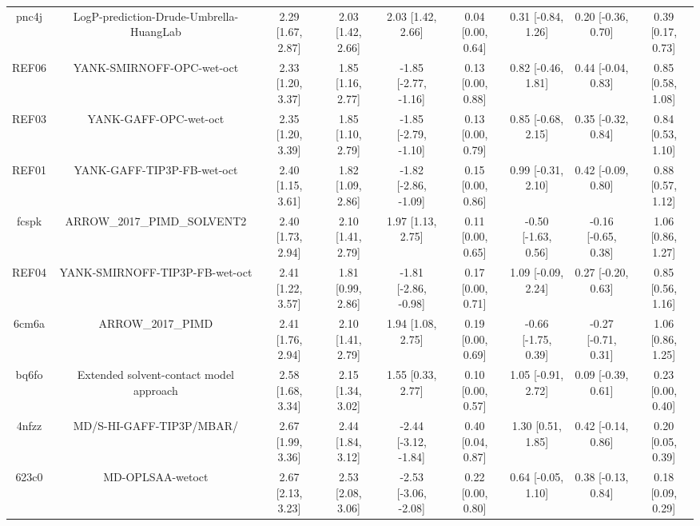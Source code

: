 \documentclass{article}
\begin{document}
\begin{center}
\begin{longtable}{|ccccccccc|}
 pnc4j &            LogP-prediction-Drude-Umbrella-HuangLab &  2.29 [1.67, 2.87] &  2.03 [1.42, 2.66] &     2.03 [1.42, 2.66] &  0.04 [0.00, 0.64] &   0.31 [-0.84, 1.26] &   0.20 [-0.36, 0.70] &     0.39 [0.17, 0.73] \\
 REF06 &                          YANK-SMIRNOFF-OPC-wet-oct &  2.33 [1.20, 3.37] &  1.85 [1.16, 2.77] &  -1.85 [-2.77, -1.16] &  0.13 [0.00, 0.88] &   0.82 [-0.46, 1.81] &   0.44 [-0.04, 0.83] &     0.85 [0.58, 1.08] \\
 REF03 &                              YANK-GAFF-OPC-wet-oct &  2.35 [1.20, 3.39] &  1.85 [1.10, 2.79] &  -1.85 [-2.79, -1.10] &  0.13 [0.00, 0.79] &   0.85 [-0.68, 2.15] &   0.35 [-0.32, 0.84] &     0.84 [0.53, 1.10] \\
 REF01 &                         YANK-GAFF-TIP3P-FB-wet-oct &  2.40 [1.15, 3.61] &  1.82 [1.09, 2.86] &  -1.82 [-2.86, -1.09] &  0.15 [0.00, 0.86] &   0.99 [-0.31, 2.10] &   0.42 [-0.09, 0.80] &     0.88 [0.57, 1.12] \\
 fcspk &                        ARROW\_2017\_PIMD\_SOLVENT2 &  2.40 [1.73, 2.94] &  2.10 [1.41, 2.79] &     1.97 [1.13, 2.75] &  0.11 [0.00, 0.65] &  -0.50 [-1.63, 0.56] &  -0.16 [-0.65, 0.38] &     1.06 [0.86, 1.27] \\
 REF04 &                     YANK-SMIRNOFF-TIP3P-FB-wet-oct &  2.41 [1.22, 3.57] &  1.81 [0.99, 2.86] &  -1.81 [-2.86, -0.98] &  0.17 [0.00, 0.71] &   1.09 [-0.09, 2.24] &   0.27 [-0.20, 0.63] &     0.85 [0.56, 1.16] \\
 6cm6a &                                  ARROW\_2017\_PIMD &  2.41 [1.76, 2.94] &  2.10 [1.41, 2.79] &     1.94 [1.08, 2.75] &  0.19 [0.00, 0.69] &  -0.66 [-1.75, 0.39] &  -0.27 [-0.71, 0.31] &     1.06 [0.86, 1.25] \\
 bq6fo &            Extended solvent-contact model approach &  2.58 [1.68, 3.34] &  2.15 [1.34, 3.02] &     1.55 [0.33, 2.77] &  0.10 [0.00, 0.57] &   1.05 [-0.91, 2.72] &   0.09 [-0.39, 0.61] &     0.23 [0.00, 0.40] \\
 4nfzz &                           MD/S-HI-GAFF-TIP3P/MBAR/ &  2.67 [1.99, 3.36] &  2.44 [1.84, 3.12] &  -2.44 [-3.12, -1.84] &  0.40 [0.04, 0.87] &    1.30 [0.51, 1.85] &   0.42 [-0.14, 0.86] &     0.20 [0.05, 0.39] \\
 623c0 &                                   MD-OPLSAA-wetoct &  2.67 [2.13, 3.23] &  2.53 [2.08, 3.06] &  -2.53 [-3.06, -2.08] &  0.22 [0.00, 0.80] &   0.64 [-0.05, 1.10] &   0.38 [-0.13, 0.84] &     0.18 [0.09, 0.29] \\

\end{longtable}
\end{center}
\end{document}
